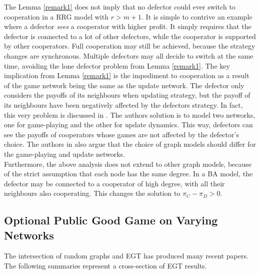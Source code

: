 The Lemma \ref{remark1} does not imply that no defector could ever switch to cooperation in a RRG model with $r>m+1$. It is simple to contrive an example where a defector \emph{sees} a cooperator with higher profit. It simply requires that the defector is connected to a lot of other defectors, while the cooperator is supported by other cooperators. Full cooperation may still be achieved, because the strategy changes are synchronous. Multiple defectors may all decide to switch at the same time, avoiding the lone defector problem from Lemma \ref{remark1}. The key implication from Lemma \ref{remark1} is the impediment to cooperation as a result of the game network being the same as the update network. The defector only considers the payoffs of its neighbours when updating strategy, but the payoff of its neighbours have been negatively affected by the defectors strategy. In fact, this very problem is discussed in \cite{RN48}. The authors solution is to model two networks, one for game-playing and the other for update dynamics. This way, defectors can see the payoffs of cooperators whose games are not affected by the defector's choice. The authors in \cite{RN48} also argue that the choice of graph models should differ for the game-playing and update networks.   \\

Furthermore, the above analysis does not extend to other graph models, because of the strict assumption that each node has the same degree. In a BA model, the defector may be connected to a cooperator of high degree, with all their neighbours also cooperating. This changes the solution to $\pi_C - \pi_D>0$. \\
\FloatBarrier


 

 
 \subsection{Optional Public Good Game on Varying Networks} 
 
  The intersection of random graphs and EGT has produced many recent papers. The following summaries represent a cross-section of EGT results.  \\
  
